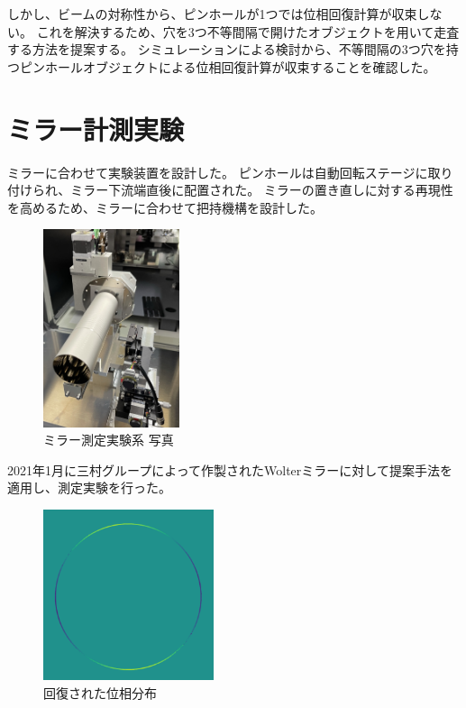 \documentclass[a4j]{jarticle}
\begin{document}
しかし、ビームの対称性から、ピンホールが1つでは位相回復計算が収束しない。
これを解決するため、穴を3つ不等間隔で開けたオブジェクトを用いて走査する方法を提案する。
シミュレーションによる検討から、不等間隔の3つ穴を持つピンホールオブジェクトによる位相回復計算が収束することを確認した。

\section{ミラー計測実験}

ミラーに合わせて実験装置を設計した。
ピンホールは自動回転ステージに取り付けられ、ミラー下流端直後に配置された。
ミラーの置き直しに対する再現性を高めるため、ミラーに合わせて把持機構を設計した。

\begin{figure}[!ht]
\centering
\includegraphics[width=4cm]{../thesis/chap5/figure/photo_mirror_pinhole.png}
\caption{ミラー測定実験系 写真}
\label{fig:photo_mirror_experiment_mirror_and_pinhole}
\end{figure}

2021年1月に三村グループによって作製されたWolterミラーに対して提案手法を適用し、測定実験を行った。

\begin{figure}[!ht]
\centering
\includegraphics[width=5cm]{../thesis/chap5/figure/reconstructed_phase_unwrapped.png}
\caption{回復された位相分布}
\label{fig:reconstructed_phase_unwrapped}
\end{figure}
\end{document}
